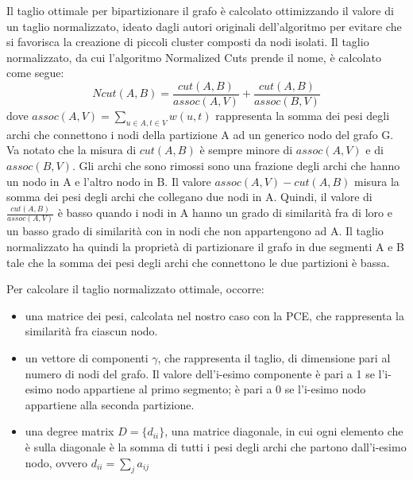 Il taglio ottimale per bipartizionare il grafo è calcolato ottimizzando il valore di un taglio normalizzato, ideato dagli autori originali dell'algoritmo per evitare che si favorisca la creazione di piccoli cluster composti da nodi isolati. Il taglio normalizzato, da cui l'algoritmo Normalized Cuts prende il nome, è calcolato come segue: 
$$ Ncut(A,B) =  \frac{cut(A,B)}{assoc(A,V)} + \frac{cut(A,B)}{assoc(B,V)} $$
dove $assoc(A,V) = \sum_{u\in A, t\in V} w(u,t) $ rappresenta la somma dei pesi degli archi che connettono i nodi della partizione A ad un generico nodo del grafo G.
Va notato che la misura di $cut(A,B)$ è sempre minore di $assoc(A,V)$ e di $assoc(B,V)$. Gli archi che sono rimossi sono una frazione degli archi che hanno un nodo in A e l'altro nodo in B. Il valore $assoc(A,V) - cut(A,B)$ misura la somma dei pesi degli archi che collegano due nodi in A. Quindi, il valore di $ \frac{cut(A,B)}{assoc(A,V)}$ è basso quando i nodi in A hanno un grado di similarità fra di loro e un basso grado di similarità con in nodi che non appartengono ad A. Il taglio normalizzato ha quindi la proprietà di partizionare il grafo in due segmenti A e B tale che la somma dei pesi degli archi che connettono le due partizioni è bassa.

Per calcolare il taglio normalizzato ottimale, occorre:
\begin{itemize}
\item una matrice dei pesi, calcolata nel nostro caso con la PCE, che rappresenta la similarità fra ciascun nodo.
\item un vettore di componenti $\gamma$, che rappresenta il taglio, di dimensione pari al numero di nodi del grafo. Il valore dell'i-esimo componente è pari a 1 se l'i-esimo nodo appartiene al primo segmento; è pari a 0 se l'i-esimo nodo appartiene alla seconda partizione.
\item una degree matrix $D = \lbrace d_{ii} \rbrace $, una matrice diagonale, in cui ogni elemento che è sulla diagonale è la somma di tutti i pesi degli archi che partono dall'i-esimo nodo, ovvero $d_{ii} = \sum_{j} a_{ij}$
\end{itemize}

